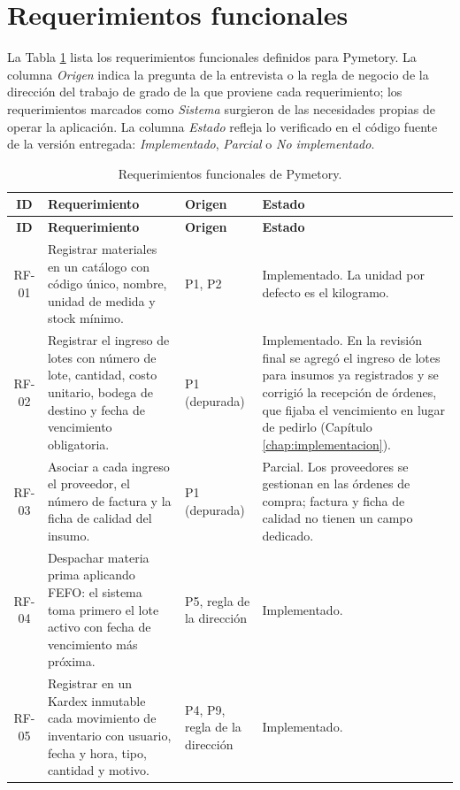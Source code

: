 \section{Requerimientos funcionales}
\label{sec:req_rf}

La Tabla \ref{tab:req_rf} lista los requerimientos funcionales definidos para Pymetory. La columna \textit{Origen} indica la pregunta de la entrevista o la regla de negocio de la dirección del trabajo de grado de la que proviene cada requerimiento; los requerimientos marcados como \textit{Sistema} surgieron de las necesidades propias de operar la aplicación. La columna \textit{Estado} refleja lo verificado en el código fuente de la versión entregada: \textit{Implementado}, \textit{Parcial} o \textit{No implementado}.

\begin{longtable}{|c|p{6.3cm}|p{1.9cm}|p{4.2cm}|}
\caption{Requerimientos funcionales de Pymetory.}
\label{tab:req_rf}\\
\hline
\textbf{ID} & \textbf{Requerimiento} & \textbf{Origen} & \textbf{Estado} \\
\hline
\endfirsthead
\hline
\textbf{ID} & \textbf{Requerimiento} & \textbf{Origen} & \textbf{Estado} \\
\hline
\endhead
RF-01 & Registrar materiales en un catálogo con código único, nombre, unidad de medida y stock mínimo. & P1, P2 & Implementado. La unidad por defecto es el kilogramo. \\ \hline
RF-02 & Registrar el ingreso de lotes con número de lote, cantidad, costo unitario, bodega de destino y fecha de vencimiento obligatoria. & P1 (depurada) & Implementado. En la revisión final se agregó el ingreso de lotes para insumos ya registrados y se corrigió la recepción de órdenes, que fijaba el vencimiento en lugar de pedirlo (Capítulo \ref{chap:implementacion}). \\ \hline
RF-03 & Asociar a cada ingreso el proveedor, el número de factura y la ficha de calidad del insumo. & P1 (depurada) & Parcial. Los proveedores se gestionan en las órdenes de compra; factura y ficha de calidad no tienen un campo dedicado. \\ \hline
RF-04 & Despachar materia prima aplicando FEFO: el sistema toma primero el lote activo con fecha de vencimiento más próxima. & P5, regla de la dirección & Implementado. \\ \hline
RF-05 & Registrar en un Kardex inmutable cada movimiento de inventario con usuario, fecha y hora, tipo, cantidad y motivo. & P4, P9, regla de la dirección & Implementado. \\ \hline

\end{longtable}
